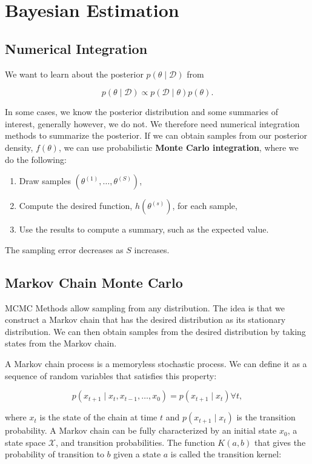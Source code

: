
\section{Bayesian Estimation}

\subsection{Numerical Integration}

We want to learn about the posterior $p(\theta\mid\mathcal{D})$ from 

\[
	p(\theta\mid\mathcal{D})\propto p(\mathcal{D}\mid\theta)p(\theta).
\]

In some cases, we know the posterior distribution and some summaries of interest, generally however, we do not. We therefore need numerical integration methods to summarize the posterior. If we can obtain samples from our posterior density, $f(\theta)$, we can use probabilistic \textbf{Monte Carlo integration}, where we do the following:

\begin{enumerate}
	\item Draw samples $(\theta^{(1)},\dots,\theta^{(S)})$,
	\item Compute the desired function, $h(\theta^{(s)})$, for each sample,
	\item Use the results to compute a summary, such as the expected value.
\end{enumerate}

The sampling error decreases as $S$ increases.

\subsection{Markov Chain Monte Carlo}

MCMC Methods allow sampling from any distribution. The idea is that we construct a Markov chain that has the desired distribution as its stationary distribution. We can then obtain samples from the desired distribution by taking states from the Markov chain.

A Markov chain process is a memoryless stochastic process. We can define it as a sequence of random variables that satisfies this property:

\[
	p(x_{t+1}\mid x_t, x_{t-1}, \dots, x_0) = p(x_{t+1}\mid x_t)\forall t,
\]

where $x_t$ is the state of the chain at time $t$ and $p(x_{t+1}\mid x_t)$ is the transition probability. A Markov chain can be fully characterized by an initial state $x_0$, a state space $\mathcal{X}$, and transition probabilities. The function $K(a,b)$ that gives the probability of transition to $b$ given a state $a$ is called the transition kernel:

